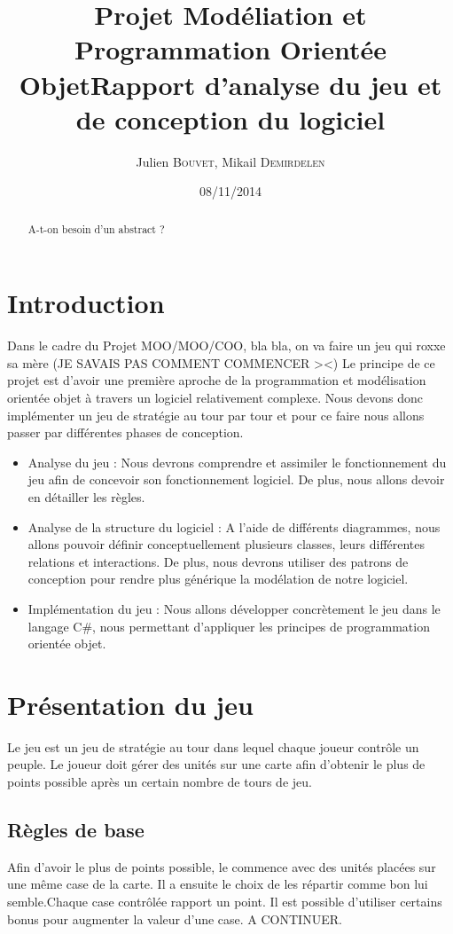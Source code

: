 \documentclass[12pt]{article}
\title{Projet Modéliation et Programmation Orientée Objet\smallbreak Rapport d'analyse du jeu et de conception du logiciel}
\author{Julien \textsc{Bouvet}, Mikail \textsc{Demirdelen} \\}
\date{08/11/2014}
\begin{document}
\maketitle
\newpage
\begin{abstract}
A-t-on besoin d'un abstract ?
\end{abstract}
\newpage
\tableofcontents
\newpage
\section{Introduction}

Dans le cadre du Projet MOO/MOO/COO, bla bla, on va faire un jeu qui roxxe sa mère (JE SAVAIS PAS COMMENT COMMENCER ><) \newline \newline
Le principe de ce projet est d'avoir une première aproche de la programmation et modélisation orientée objet à travers un logiciel relativement complexe. Nous devons donc implémenter un jeu de stratégie au tour par tour et pour ce faire nous allons passer par différentes phases de conception.
\begin{itemize}
  \item Analyse du jeu : Nous devrons comprendre et assimiler le fonctionnement du jeu afin de concevoir son fonctionnement logiciel. De plus, nous allons devoir en détailler les règles.
  \item Analyse de la structure du logiciel :  A l'aide de différents diagrammes, nous allons pouvoir définir conceptuellement plusieurs classes, leurs différentes relations et interactions. De plus, nous devrons utiliser des patrons de conception pour rendre plus générique la modélation de notre logiciel.
  \item Implémentation du jeu : Nous allons développer concrètement le jeu dans le langage C\#, nous permettant d'appliquer les principes de programmation orientée objet.
\end{itemize}
\newpage

\section{Présentation du jeu}
Le jeu est un jeu de stratégie au tour dans lequel chaque joueur contrôle un peuple. Le joueur doit gérer des unités sur une carte afin d'obtenir le plus de points possible après un certain nombre de tours de jeu.
\subsection{Règles de base}
 Afin d'avoir le plus de points possible, le commence avec des unités placées sur une même case de la carte. Il a ensuite le choix de les répartir comme bon lui semble.Chaque case contrôlée rapport un point. Il est possible d'utiliser certains bonus pour augmenter la valeur d'une case. A CONTINUER.
\end{document}
